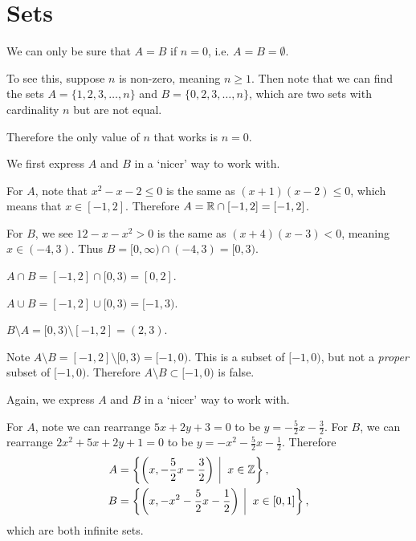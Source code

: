 \section{Sets}
\begin{questions}
    \item We can only be sure that $A = B$ if $n = 0$, i.e. $A = B = \emptyset$.

    To see this, suppose $n$ is non-zero, meaning $n \geq 1$. Then note that we can find the sets $A = \{1, 2, 3, \dots, n\}$ and $B = \{0, 2, 3, \dots, n\}$, which are two sets with cardinality $n$ but are not equal.

    Therefore the only value of $n$ that works is $n = 0$.

    \item We first express $A$ and $B$ in a `nicer' way to work with.

    For $A$, note that $x^2 - x - 2 \leq 0$ is the same as $(x+1)(x-2) \leq 0$, which means that $x \in [-1, 2]$. Therefore $A = \mathbb{R} \cap [-1, 2] = [-1, 2]$.

    For $B$, we see $12 - x - x^2 > 0$ is the same as $(x+4)(x-3) < 0$, meaning $x \in (-4, 3)$. Thus $B = [0, \infty) \cap (-4, 3) = [0, 3)$.

    \begin{partquestions}{\alph*}
        \item $A \cap B = [-1, 2] \cap [0, 3) = [0, 2]$.
        \item $A \cup B = [-1, 2] \cup [0, 3) = [-1, 3)$.
        \item $B \setminus A = [0, 3) \setminus [-1, 2] = (2, 3)$.
        \item Note $A \setminus B = [-1, 2] \setminus [0, 3) = [-1, 0)$. This is a subset of $[-1, 0)$, but not a \textit{proper} subset of $[-1, 0)$. Therefore $A\setminus B \subset [-1, 0)$ is false.
    \end{partquestions}

    \item Again, we express $A$ and $B$ in a `nicer' way to work with.

    For $A$, note we can rearrange $5x+2y+3=0$ to be $y=-\frac52x-\frac32$. For $B$, we can rearrange $2x^2+5x+2y+1=0$ to be $y=-x^2-\frac52x-\frac12$. Therefore
    \begin{align*}
        A &= \left\{\left(x, -\frac52x-\frac32\right) \vert x \in \Z \right\},\\
        B &= \left\{\left(x, -x^2-\frac52x-\frac12\right) \vert x \in [0, 1] \right\},
    \end{align*}
    which are both infinite sets.


\end{questions}
